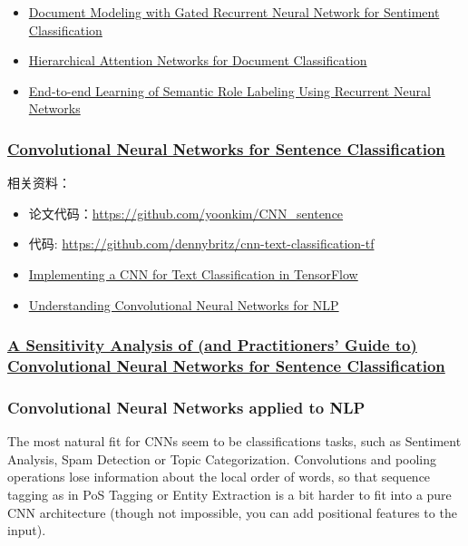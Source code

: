 \begin{itemize}
\item \href{http://www.aclweb.org/old_anthology/D/D15/D15-1167.pdf}{Document Modeling with Gated Recurrent Neural Network for Sentiment Classification}
\item \href{http://www.aclweb.org/anthology/N16-1174}{Hierarchical Attention Networks for Document Classification}
\item \href{http://www.aclweb.org/anthology/P15-1109}{End-to-end Learning of Semantic Role Labeling Using Recurrent Neural Networks}
\end{itemize}

\subsubsection{\href{https://arxiv.org/abs/1408.5882}{Convolutional Neural Networks for Sentence Classification}}

相关资料：
\begin{itemize}
\item 论文代码：\url{https://github.com/yoonkim/CNN_sentence}
\item 代码: \url{https://github.com/dennybritz/cnn-text-classification-tf}
\item \href{http://www.wildml.com/2015/12/implementing-a-cnn-for-text-classification-in-tensorflow/}{Implementing a CNN for Text Classification in TensorFlow}
\item \href{http://www.wildml.com/2015/11/understanding-convolutional-neural-networks-for-nlp/}{Understanding Convolutional Neural Networks for NLP}
\end{itemize}

\subsubsection{\href{https://arxiv.org/abs/1510.03820}{A Sensitivity Analysis of (and Practitioners’ Guide to) Convolutional Neural Networks for Sentence Classification}}

\subsubsection{Convolutional Neural Networks applied to NLP}

The most natural fit for CNNs seem to be classifications tasks, such as Sentiment Analysis, Spam Detection or Topic Categorization. Convolutions and pooling operations lose information about the local order of words, so that sequence tagging as in PoS Tagging or Entity Extraction is a bit harder to fit into a pure CNN architecture (though not impossible, you can add positional features to the input).

